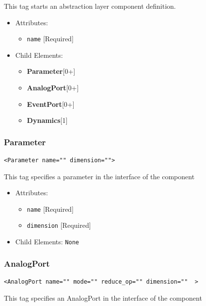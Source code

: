 \documentclass{article}
\newcommand{\Dynamics}{{\bf{Dynamics}}\xspace}
\newcommand{\AnalogPort}{{\bf{AnalogPort}}\xspace}
\newcommand{\EventPort}{{\bf{EventPort}}\xspace}
\newcommand{\Parameter}{{\bf{Parameter}}\xspace}
\begin{document}
This tag starts an abstraction layer component definition.

\begin{itemize}
\item Attributes:
%
\begin{itemize}
\item \verb|name| {[}Required{]}
\end{itemize}

\item Child Elements:
%
\begin{itemize}
\item \Parameter {[}0+{]}
\item \AnalogPort{[}0+{]}
\item \EventPort {[}0+{]}
\item \Dynamics  {[}1{]}
\end{itemize}

\end{itemize}

\subsubsection{Parameter}
%
\begin{lstlisting}
<Parameter name="" dimension="">
\end{lstlisting}

This tag specifies a parameter in the interface of the component

\begin{itemize}
\item Attributes:
%
\begin{itemize}
\item \verb|name| {[}Required{]}
\item \verb|dimension| {[}Required{]}
\end{itemize}

\item Child Elements: \texttt{None}
\end{itemize}

\subsubsection{AnalogPort}
%
\begin{lstlisting}
<AnalogPort name="" mode="" reduce_op="" dimension=""  >
\end{lstlisting}

This tag specifies an AnalogPort in the interface of the component
\end{document}

